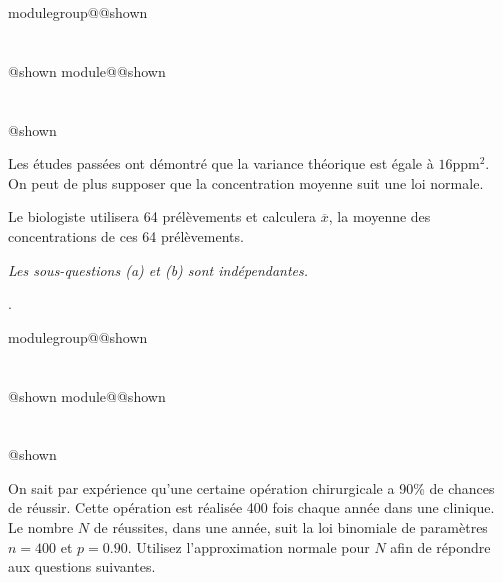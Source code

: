 \documentclass{Evaluation}
\makeatletter
\newcommand{\currentmodulekey}{}
\newcommand{\currentmoduletitle}{}
\newcommand{\currentgroupkey}{}
\newcommand{\currentgrouptitle}{}
\newcommand{\showmoduleifneeded}{%
  \ifx\currentgroupkey\empty\else
    \expandafter\ifx\csname modulegroup@\currentgroupkey @shown\endcsname\relax
      \section*{\currentgrouptitle}%
      \expandafter\gdef\csname modulegroup@\currentgroupkey @shown\endcsname{1}%
    \fi
  \fi
  \expandafter\ifx\csname module@\currentmodulekey @shown\endcsname\relax
    \section*{\currentmoduletitle}%
    \expandafter\gdef\csname module@\currentmodulekey @shown\endcsname{1}%
  \fi
}
\newenvironment{A24}{\showmoduleifneeded}{}
\makeatother
\begin{document}
\begin{questions}
\begin{A24}
Les études passées ont démontré que la variance théorique est égale à $16$ppm$^2$. On peut de plus supposer que la concentration moyenne suit une loi normale. 

Le biologiste utilisera 64 prélèvements et calculera $\overline{x}$, la moyenne des concentrations de ces 64 prélèvements. 

\textit{Les sous-questions (a) et (b) sont indépendantes.}

.
\end{A24}

\begin{A24}
\question {} %
\label{A24-F2-assu}
On sait par expérience qu’une certaine opération chirurgicale a 90\% de
chances de réussir. Cette opération est réalisée  400 fois chaque année dans une clinique.
Le nombre $N$ de réussites, dans une année, suit la loi binomiale de paramètres $n= 400$ et $p= 0.90$. Utilisez  l’approximation normale pour $N$ afin de  répondre aux questions suivantes.
\begin{parts}

\end{parts}
\end{A24}
\end{questions}
\end{document}
